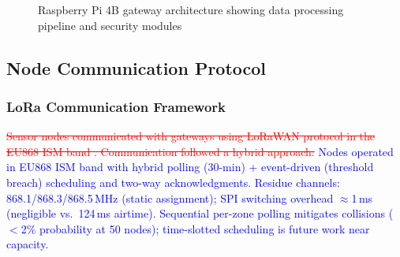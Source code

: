 \documentclass[pdflatex,sn-mathphys-num]{sn-jnl}
\theoremstyle{thmstyleone}
\theoremstyle{thmstyletwo}
\theoremstyle{thmstylethree}
\begin{document}
{\begin{figure}
{}%
  \caption{Raspberry Pi 4B gateway architecture showing data processing pipeline and security modules}
  \label{fig:gateway-architecture}
\end{figure}

\subsection{Node Communication Protocol}
\label{subsec:communication_protocol}

\subsubsection{LoRa Communication Framework}
\textcolor{red}{\sout{Sensor nodes communicated with gateways using LoRaWAN protocol in the EU868 ISM band . Communication followed a hybrid approach:}}
\textcolor{blue}{Nodes operated in EU868 ISM band \cite{ttn2024eu868,loraalliance2021regional} with hybrid polling (30-min) + event-driven (threshold breach) scheduling and two-way acknowledgments. Residue channels: 868.1/868.3/868.5\,MHz (static assignment); SPI switching overhead $\approx$1\,ms (negligible vs.\ 124\,ms airtime). Sequential per-zone polling mitigates collisions ($<$2\% probability at 50 nodes); time-slotted scheduling is future work near capacity.}

}
\end{document}
